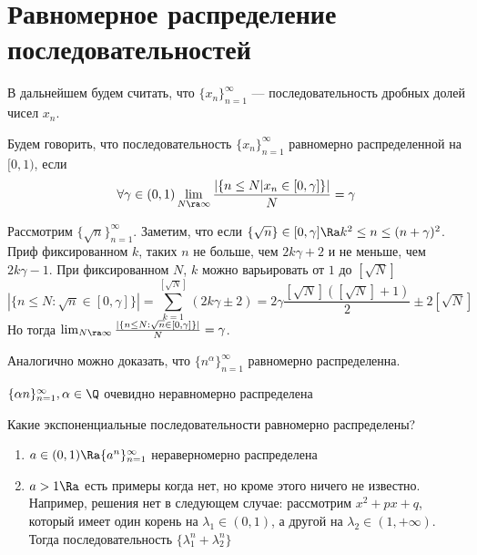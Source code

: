 
\section{Равномерное распределение последовательностей}
В дальнейшем будем считать, что \(\{x_n\}_{n = 1}^\infty\) --- последовательность дробных долей чисел \(x_n\).
\begin{definition}
    Будем говорить, что последовательность \(\{x_n\}_{n = 1}^\infty\) равномерно распределенной на \([0, 1)\), если
    \[\forall \gamma \in (0, 1) \lim_{N \ra \infty} \frac{|\{n \le N | x_n \in [0, \gamma]\}|}{N} = \gamma\]
\end{definition}

\begin{example}
    Рассмотрим \(\{\sqrt{n}\}^\infty_{n = 1}\). Заметим, что если \(\{\sqrt{n}\} \in [0, \gamma] \Ra k^2 \le n \le (n + \gamma)^2\). Приф фиксированном \(k\), таких \(n\) не больше, чем \(2k\gamma + 2\) и не меньше, чем \(2k\gamma - 1\). При фиксированном \(N\), \(k\) можно варьировать от \(1\) до \([\sqrt{N}]\)
    \[|\{n \le N : \sqrt{n} \in [0, \gamma]\}| = \sum_{k = 1}^{[\sqrt{N}]} (2k\gamma \pm 2) = 2\gamma\frac{[\sqrt{N}]([\sqrt{N}] + 1)}{2} \pm 2 [\sqrt{N}]\]
    Но тогда \(\lim_{N \ra \infty} \frac{|\{n \le N : \sqrt{n} \in [0, \gamma]\}|}{N} = \gamma\).
\end{example}

\begin{note}
    Аналогично можно доказать, что \(\{n^\alpha\}^\infty_{n = 1}\) равномерно распределенна.
\end{note}

\begin{example}
    \(\{\alpha n\}_{n = 1}^\infty, \alpha \in \Q\) очевидно неравномерно распределена
\end{example}

Какие экспоненциальные последовательности равномерно распределены?
\begin{enumerate}
    \item \(a \in (0, 1) \Ra \{a^n\}_{n = 1}^\infty\) нераверномерно распределена
    \item \(a > 1 \Ra \) есть примеры когда нет, но кроме этого ничего не известно. Например, решения нет в следующем случае: рассмотрим \(x^2 + px + q\), который имеет один корень на \(\lambda_1 \in (0, 1)\), а другой на \(\lambda_2 \in (1, +\infty)\). Тогда последовательность \(\{\lambda_1^n + \lambda_2^n\}\)
\end{enumerate}

